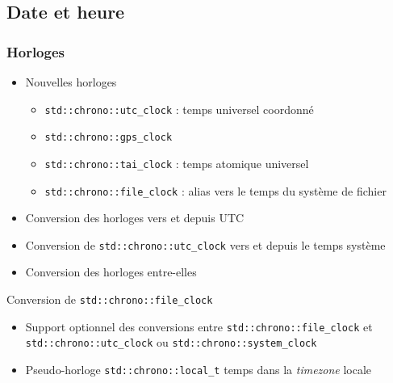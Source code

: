 \documentclass[C++.tex]{subfiles}
\begin{document}
\subsection*{Date et heure}
\begin{frame}[fragile]
	\frametitle{Horloges}
	\begin{itemize}
		\item Nouvelles horloges


		\begin{itemize}
			\item \lstinline|std::chrono::utc_clock| : temps universel coordonné


			\item \lstinline|std::chrono::gps_clock|


			\item \lstinline|std::chrono::tai_clock| : temps atomique universel


			\item \lstinline|std::chrono::file_clock| : alias vers le temps du système de fichier
		\end{itemize}
		\item Conversion des horloges vers et depuis UTC
		\item Conversion de \lstinline|std::chrono::utc_clock| vers et depuis le temps système
		\item Conversion des horloges entre-elles

	\end{itemize}

	\begin{alertblock}{Conversion de \lstinline|std::chrono::file_clock|}
		\begin{itemize}
			\item Support optionnel des conversions entre \lstinline|std::chrono::file_clock| et \lstinline|std::chrono::utc_clock| ou \lstinline|std::chrono::system_clock|
		\end{itemize}
	\end{alertblock}

	\begin{itemize}
		\item Pseudo-horloge \lstinline|std::chrono::local_t| temps dans la \textit{timezone} locale
	\end{itemize}
\end{frame}
\end{document}
